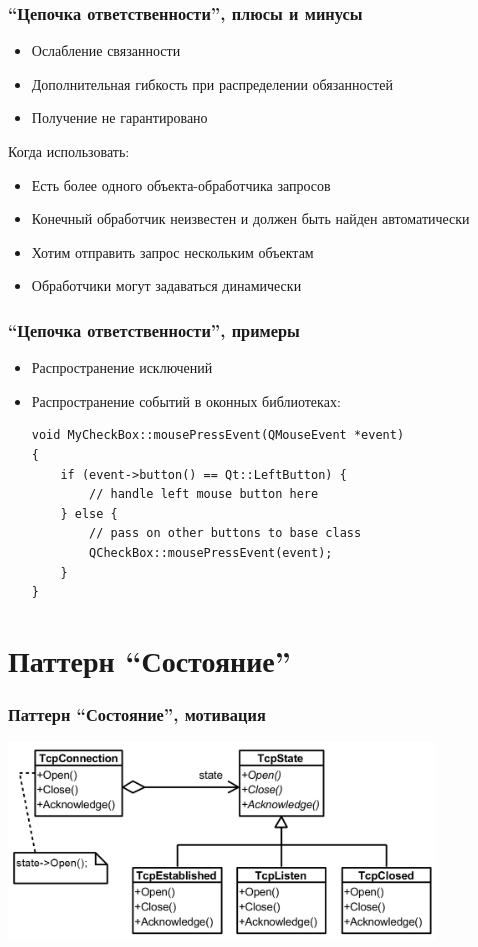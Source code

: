 \documentclass[xetex,mathserif,serif]{beamer}
\begin{document}
	\begin{frame}
		\frametitle{``Цепочка ответственности'', плюсы и минусы}
		\begin{itemize}
			\item Ослабление связанности
			\item Дополнительная гибкость при распределении обязанностей
			\item Получение не гарантировано
		\end{itemize}
		Когда использовать:
		\begin{itemize}
			\item Есть более одного объекта-обработчика запросов
			\item Конечный обработчик неизвестен и должен быть найден автоматически
			\item Хотим отправить запрос нескольким объектам
			\item Обработчики могут задаваться динамически
		\end{itemize}
	\end{frame}

	\begin{frame}[fragile]
		\frametitle{``Цепочка ответственности'', примеры}
		\begin{itemize}
			\item Распространение исключений
			\item Распространение событий в оконных библиотеках:
			\begin{verbatim}
void MyCheckBox::mousePressEvent(QMouseEvent *event)
{
    if (event->button() == Qt::LeftButton) {
        // handle left mouse button here
    } else {
        // pass on other buttons to base class
        QCheckBox::mousePressEvent(event);
    }
}
			\end{verbatim}
		\end{itemize}
	\end{frame}

	\section{Паттерн ``Состояние''}

	\begin{frame}
		\frametitle{Паттерн ``Состояние'', мотивация}
		\begin{center}
			\includegraphics[width=0.85\textwidth]{stateExample.png}
		\end{center}
	\end{frame}
\end{document}
